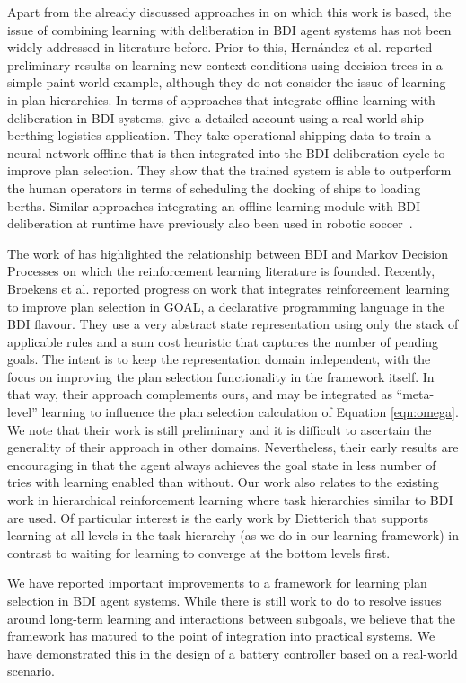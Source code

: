 Apart from the already discussed approaches in \cite{airiau09:enhancing,singh10:extending,singh10:learning} on which this work is based, the issue of combining learning with deliberation in BDI agent systems has not been widely addressed in literature before. 
%
Prior to this, Hern\'andez et al. \cite{hernandez04:learning} reported preliminary results on learning new context conditions using decision trees in a simple paint-world example, although they do not consider the issue of learning in plan hierarchies. In terms of approaches that integrate offline learning with deliberation in BDI systems, \cite{lokuge07:improving} give a detailed account using a real world ship berthing logistics application. They take operational shipping data to train a neural network offline that is then integrated into the BDI deliberation cycle to improve plan selection. They show that the trained system is able to outperform the human operators in terms of scheduling the docking of ships to loading berths. Similar approaches integrating an offline learning module with BDI deliberation at runtime have previously also been used in robotic soccer~\cite{riedmiller01:karlsruhe,brusey02:learning}.

The work of \cite{simari06:relationship} has highlighted the relationship between BDI and Markov Decision Processes on which the reinforcement learning literature is founded. 
%
Recently, Broekens et al. \cite{broekens10:reinforcement} reported progress on work that integrates reinforcement learning to improve plan selection in GOAL, a declarative programming language in the BDI flavour. They use a very abstract state representation using only the stack of applicable rules and a sum cost heuristic that captures the number of pending goals. The intent is to keep the representation domain independent, with the focus on improving the plan selection functionality in the framework itself. In that way, their approach complements ours, and may be integrated as ``meta-level'' learning to influence the plan selection calculation of Equation \ref{eqn:omega}. We note that their work is still preliminary and it is difficult to ascertain the generality of their approach in other domains. Nevertheless, their early results are encouraging in that the agent always achieves the goal state in less number of tries with learning enabled than without.
%
Our work also relates to the existing work in hierarchical reinforcement learning \cite{barto03:recent} where task hierarchies similar to BDI are used. Of particular interest is the early work by Dietterich \cite{dietterich00:hierarchical} that supports learning at all levels in the task hierarchy (as we do in our learning framework) in contrast to waiting for learning to converge at the bottom levels first.

We have reported important improvements to a framework for learning plan selection in BDI agent systems. While there is still work to do to resolve issues around long-term learning and interactions between subgoals, we believe that the framework has matured to the point of integration into practical systems. We have demonstrated this in the design of a battery controller based on a real-world scenario.




